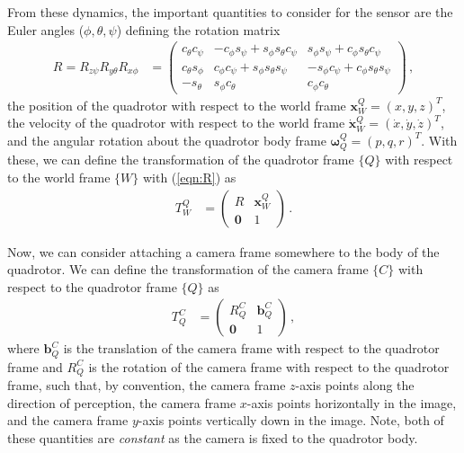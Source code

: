 \documentclass[11pt]{article}
\begin{document}
From these dynamics, the important quantities to consider for the sensor are the Euler angles ($\phi,\theta,\psi$) defining the rotation matrix
\begin{align}\label{eqn:R}
    R=R_{z\psi}R_{y\theta}R_{x\phi}&=\begin{pmatrix}
        c_\theta c_\psi & -c_\phi s_\psi+s_\phi s_\theta c_\psi & s_\phi s_\psi+c_\phi s_\theta c_\psi\\
        c_\theta s_\phi & c_\phi c_\psi+s_\phi s_\theta s_\psi & -s_\phi c_\psi+c_\phi s_\theta s_\psi\\
        -s_\theta & s_\phi c_\theta & c_\phi c_\theta
    \end{pmatrix}\,,
\end{align}
the position of the quadrotor with respect to the world frame $\mathbf x_W^Q=(x,y,z)^T$, the velocity of the quadrotor with respect to the world frame $\dot{\mathbf x}_W^Q=(\dot x,\dot y,\dot z)^T$, and the angular rotation about the quadrotor body frame $\boldsymbol\omega_Q^Q=(p,q,r)^T$. With these, we can define the transformation of the quadrotor frame $\{Q\}$ with respect to the world frame $\{W\} $ with (\ref{eqn:R}) as
\begin{align}\label{eqn:TWQ}
    T_W^Q&=\begin{pmatrix}
        R & \mathbf x_W^Q\\\mathbf0 & 1
    \end{pmatrix}\,.
\end{align}

Now, we can consider attaching a camera frame somewhere to the body of the quadrotor. We can define the transformation of the camera frame $\{C\}$ with respect to the quadrotor frame $\{Q\}$ as
\begin{align}\label{eqn:TQC}
    T_Q^C&=\begin{pmatrix}
        R_Q^C & \mathbf b_Q^C\\\mathbf0 & 1
    \end{pmatrix}\,,
\end{align}
where $\mathbf b_Q^C$ is the translation of the camera frame with respect to the quadrotor frame and $R_Q^C$ is the rotation of the camera frame with respect to the quadrotor frame, such that, by convention, the camera frame $z$-axis points along the direction of perception, the camera frame $x$-axis points horizontally in the image, and the camera frame $y$-axis points vertically down in the image. Note, both of these quantities are \textit{constant} as the camera is fixed to the quadrotor body.
\end{document}
